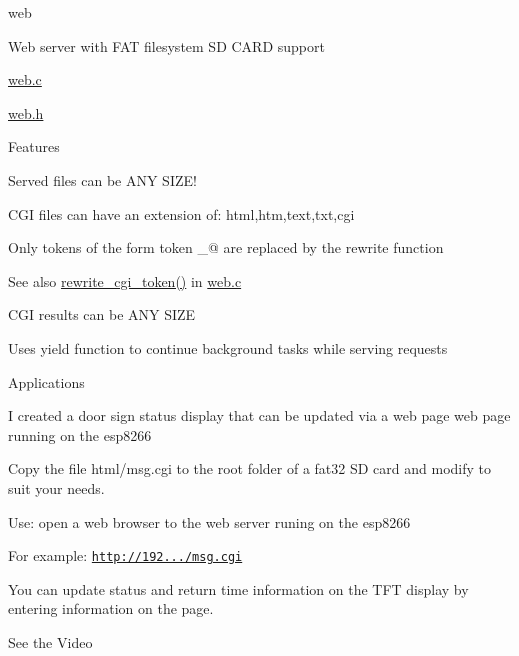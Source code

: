 web
\begin{DoxyItemize}
\item Web server with F\+AT filesystem SD C\+A\+RD support
\begin{DoxyItemize}
\item \hyperlink{web_8c}{web.\+c}
\item \hyperlink{web_8h}{web.\+h}
\end{DoxyItemize}
\item Features
\begin{DoxyItemize}
\item Served files can be A\+NY S\+I\+Z\+E!
\item C\+GI files can have an extension of\+: html,htm,text,txt,cgi
\item Only tokens of the form  token \+\_\+@ are replaced by the rewrite function
\begin{DoxyItemize}
\item \begin{DoxySeeAlso}{See also}
\hyperlink{web_8c_abfb5be0ab21dfe56bc934a8965154384}{rewrite\+\_\+cgi\+\_\+token()} in \hyperlink{web_8c}{web.\+c}
\end{DoxySeeAlso}

\item C\+GI results can be A\+NY S\+I\+ZE
\item Uses yield function to continue background tasks while serving requests
\end{DoxyItemize}
\end{DoxyItemize}
\item Applications
\begin{DoxyItemize}
\item I created a door sign status display that can be updated via a web page web page running on the esp8266
\begin{DoxyItemize}
\item Copy the file html/msg.\+cgi to the root folder of a fat32 SD card and modify to suit your needs.
\item Use\+: open a web browser to the web server runing on the esp8266
\begin{DoxyItemize}
\item For example\+: \href{http://192.168.200.116/msg.cgi}{\tt http\+://192.../msg.\+cgi}
\item You can update status and return time information on the T\+FT display by entering information on the page.
\end{DoxyItemize}
\item See the Video
\end{DoxyItemize}
\end{DoxyItemize}
\end{DoxyItemize}

